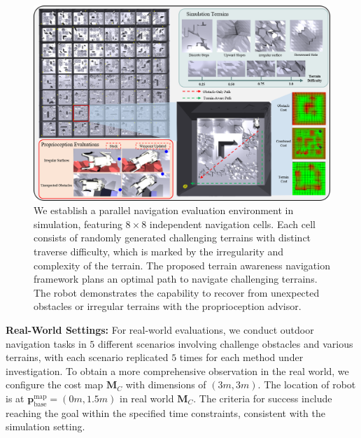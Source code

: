 \documentclass[conference]{IEEEtran}
\begin{document}
\begin{figure}[htbp]
\centerline{\includegraphics[width=16.6cm]{figures/simulation.pdf}}
\caption{ We establish a parallel navigation evaluation environment in simulation, featuring ${8\times8}$ independent navigation cells. Each cell consists of randomly generated challenging terrains with distinct traverse difficulty, which is marked by the irregularity and complexity of the terrain. The proposed terrain awareness navigation framework plans an optimal path to navigate challenging terrains. The robot demonstrates the capability to recover from unexpected obstacles or irregular terrains with the proprioception advisor.}
\label{simulation}
\end{figure}

\noindent\textbf{Real-World Settings:} For real-world evaluations, we conduct outdoor navigation tasks in $5$ different scenarios involving challenge obstacles and various terrains, with each scenario replicated $5$ times for each method under investigation. {To obtain a more comprehensive observation in the real world, we configure the cost map $\bm{M}_C$ with dimensions of $(3m, 3m)$}. The location of robot is at ${\bm{p}_\textrm{base}^\textrm{map}=(0m, 1.5m)}$ in real world $\bm{M}_C$. The criteria for success include reaching the goal within the specified time constraints, consistent with the simulation setting.
\end{document}
